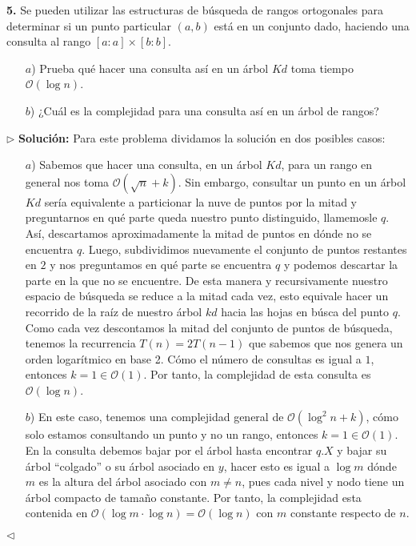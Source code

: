 \textbf{5.} Se pueden utilizar las estructuras de búsqueda de rangos ortogonales para determinar
si un punto particular $(a, b)$ está en un conjunto dado, haciendo una consulta al rango
$[a : a] \times [b : b]$.
\begin{enumerate}
\item[$a$)] Prueba qué hacer una consulta así en un árbol $Kd$ toma tiempo $\mathcal{O}(\log n)$.
\item[$b$)] ¿Cuál es la complejidad para una consulta así en un árbol de rangos?
\end{enumerate}

$\rhd$ \textbf{Solución:} Para este problema dividamos la solución en dos posibles casos:
\begin{enumerate}
\item[$a$)] Sabemos que hacer una consulta, en un árbol $Kd$, para un rango en
general nos toma $\mathcal{O}(\sqrt{n} + k)$. Sin embargo, consultar un punto
en un árbol $Kd$ sería equivalente a particionar la nuve de puntos por la mitad
y preguntarnos en qué parte queda nuestro punto distinguido, llamemosle $q$. Así,
descartamos aproximadamente la mitad de puntos en dónde no se encuentra $q$. Luego,
subdividimos nuevamente el conjunto de puntos restantes en $2$ y nos preguntamos
en qué parte se encuentra $q$ y podemos descartar la parte en la que no se encuentre.
De esta manera y recursivamente nuestro espacio de búsqueda se reduce a la mitad cada
vez, esto equivale hacer un recorrido de la raíz de nuestro árbol $kd$ hacia las hojas
en búsca del punto $q$. Como cada vez descontamos la mitad del conjunto de puntos
de búsqueda, tenemos la recurrencia $T(n) = 2T(n - 1)$ que sabemos que nos genera
un orden logarítmico en base 2. Cómo el número de consultas es igual a $1$, entonces
$k = 1 \in \mathcal{O}(1)$. Por tanto, la complejidad de esta consulta es
$\mathcal{O}(\log n)$.
\item[$b$)] En este caso, tenemos una complejidad general de $\mathcal{O}(\log^2 n + k)$,
cómo solo estamos consultando un punto y no un rango, entonces $k = 1 \in \mathcal{O}(1)$.
En la consulta debemos bajar por el árbol hasta encontrar $q.X$ y bajar su árbol ``colgado''
o su árbol asociado en $y$, hacer esto es igual a $\log m$ dónde $m$ es la altura del árbol
asociado con $m \not= n$, pues cada nivel y nodo tiene un árbol compacto de tamaño constante.
Por tanto, la complejidad esta contenida en $\mathcal{O}(\log m \cdot \log n) = \mathcal{O}(\log n)$
con $m$ constante respecto de $n$.

\end{enumerate}
\hfill $\lhd$
